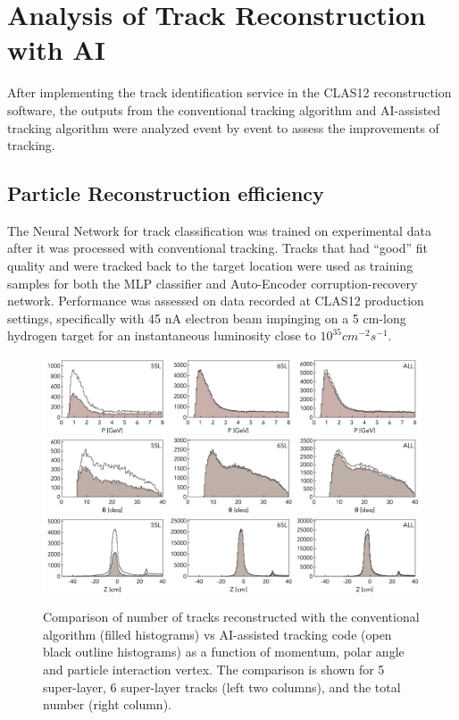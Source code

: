 \section{Analysis of Track Reconstruction with AI}

After implementing the track identification service in the CLAS12 
reconstruction software, the outputs from the conventional tracking 
algorithm and AI-assisted tracking algorithm were analyzed event by 
event to assess the improvements of tracking. 
 
 \subsection{Particle Reconstruction efficiency}
 
 The Neural Network for track classification was trained on experimental 
 data after it was processed with conventional tracking. Tracks that had ``good'' 
 fit quality and were tracked back to the target location were used as training 
 samples for both the MLP classifier and Auto-Encoder corruption-recovery network. 
 Performance was assessed on data recorded at CLAS12 production settings, 
 specifically with 45 nA electron beam impinging on a 5 cm-long hydrogen target 
 for an instantaneous luminosity close to $10^{35} cm^{-2} s^{-1}$.

 \begin{figure}[!ht]
\begin{center}
  \includegraphics[width=6.5in]{images/figure_p.pdf}
  \includegraphics[width=6.5in]{images/figure_theta.pdf}
    \includegraphics[width=6.5in]{images/figure_vz.pdf}
\caption { Comparison of number of tracks reconstructed with the conventional 
algorithm (filled histograms) vs AI-assisted tracking code (open black outline 
histograms) as a function of momentum, polar angle and particle interaction vertex. 
The comparison is shown for 5 super-layer, 6 super-layer tracks (left two columns), 
and the total number (right column).}
 \label{track:efficiency}
 \end{center}
\end{figure}

